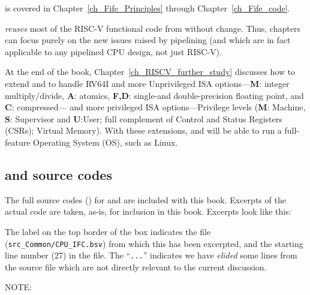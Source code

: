 {\FIFE} is covered in Chapter~\ref{ch_Fife_Principles} through
Chapter~\ref{ch_Fife_code}.

{\FIFE} \emph{reuses} most of the RISC-V functional code from {\DRUM}
without change.  Thus, {\FIFE} chapters can focus purely on the new
issues raised by pipelining (and which are in fact applicable to any
pipelined CPU design, not just RISC-V).

At the end of the book, Chapter~\ref{ch_RISCV_further_study} discusses
how to extend {\DRUM} and {\FIFE} to handle RV64I and more
Unprivileged ISA options---{\bf M}: integer multiply/divide, {\bf A}:
atomics, {\bf F,D}: single-and double-precision floating point, and
{\bf C}: compressed--- and more privileged ISA options---Privilege
levels ({\bf M}: Machine, {\bf S}: Supervisor and {\bf U}:User; full
complement of Control and Status Registers (CSRs); Virtual Memory).
With these extensions, {\DRUM} and {\FIFE} will be able to run a
full-feature Operating System (OS), such as Linux.


\subsection{{\DRUM} and {\FIFE} source codes}

The full source codes ({\BSV}) for {\DRUM} and {\FIFE} are included with this
book.  Excerpts of the actual code are taken, as-is, for inclusion in
this book.  Excerpts look like this:


The label on the top border of the box indicates the file
(\verb|src_Common/CPU_IFC.bsv|) from which this has been excerpted,
and the starting line number (27) in the file.  The ``\verb|...|''
indicates we have \emph{elided} some lines from the source file which
are not directly relevant to the current discussion.

\vspace{1ex}

NOTE: 

\vspace{1ex}

